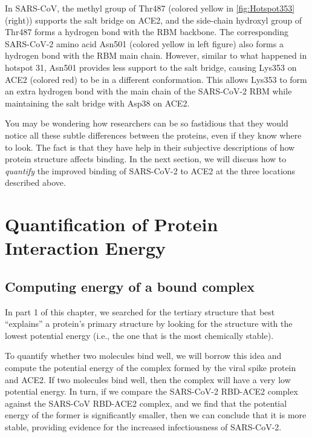 In SARS-CoV, the methyl group of Thr487 (colored yellow in \autoref{fig:Hotspot353} (right)) supports the salt bridge on ACE2, and the side-chain hydroxyl group of Thr487 forms a hydrogen bond with the RBM backbone. The corresponding SARS-CoV-2 amino acid Asn501 (colored yellow in left figure) also forms a hydrogen bond with the RBM main chain. However, similar to what happened in hotspot 31, Asn501 provides less support to the salt bridge, causing Lys353 on ACE2 (colored red) to be in a different conformation. This allows Lys353 to form an extra hydrogen bond with the main chain of the SARS-CoV-2 RBM while maintaining the salt bridge with Asp38 on ACE2.

You may be wondering how researchers can be so fastidious that they would notice all these subtle differences between the proteins, even if they know where to look. The fact is that they have help in their subjective descriptions of how protein structure affects binding. In the next section, we will discuss how to \textit{quantify} the improved binding of SARS-CoV-2 to ACE2 at the three locations described above.\\

\FloatBarrier
{}

\section{Quantification of Protein Interaction Energy}
\label{sec:interaction_energy}
\subsection{Computing energy of a bound complex}

In part 1 of this chapter, we searched for the tertiary structure that best ``explains'' a protein's primary structure by looking for the structure with the lowest potential energy (i.e., the one that is the most chemically stable).

To quantify whether two molecules bind well, we will borrow this idea and compute the potential energy of the complex formed by the viral spike protein and ACE2. If two molecules bind well, then the complex will have a very low potential energy. In turn, if we compare the SARS-CoV-2 RBD-ACE2 complex against the SARS-CoV RBD-ACE2 complex, and we find that the potential energy of the former is significantly smaller, then we can conclude that it is more stable, providing evidence for the increased infectiousness of SARS-CoV-2.

